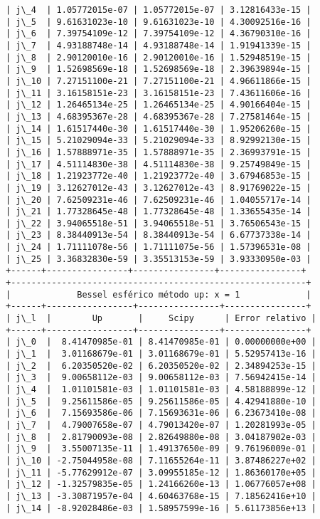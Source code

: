 \documentclass[9pt]{article}
\begin{document}
\begin{Verbatim}[commandchars=\\\{\}]
| j\_4  | 1.05772015e-07 | 1.05772015e-07 | 3.12816433e-15 |
| j\_5  | 9.61631023e-10 | 9.61631023e-10 | 4.30092516e-16 |
| j\_6  | 7.39754109e-12 | 7.39754109e-12 | 4.36790310e-16 |
| j\_7  | 4.93188748e-14 | 4.93188748e-14 | 1.91941339e-15 |
| j\_8  | 2.90120010e-16 | 2.90120010e-16 | 1.52948519e-15 |
| j\_9  | 1.52698569e-18 | 1.52698569e-18 | 2.39639894e-15 |
| j\_10 | 7.27151100e-21 | 7.27151100e-21 | 4.96611866e-15 |
| j\_11 | 3.16158151e-23 | 3.16158151e-23 | 7.43611606e-16 |
| j\_12 | 1.26465134e-25 | 1.26465134e-25 | 4.90166404e-15 |
| j\_13 | 4.68395367e-28 | 4.68395367e-28 | 7.27581464e-15 |
| j\_14 | 1.61517440e-30 | 1.61517440e-30 | 1.95206260e-15 |
| j\_15 | 5.21029094e-33 | 5.21029094e-33 | 8.92992130e-15 |
| j\_16 | 1.57888971e-35 | 1.57888971e-35 | 2.36993791e-15 |
| j\_17 | 4.51114830e-38 | 4.51114830e-38 | 9.25749849e-15 |
| j\_18 | 1.21923772e-40 | 1.21923772e-40 | 3.67946853e-15 |
| j\_19 | 3.12627012e-43 | 3.12627012e-43 | 8.91769022e-15 |
| j\_20 | 7.62509231e-46 | 7.62509231e-46 | 1.04055717e-14 |
| j\_21 | 1.77328645e-48 | 1.77328645e-48 | 1.33655435e-14 |
| j\_22 | 3.94065518e-51 | 3.94065518e-51 | 3.76506543e-15 |
| j\_23 | 8.38440913e-54 | 8.38440913e-54 | 6.67737338e-14 |
| j\_24 | 1.71111078e-56 | 1.71111075e-56 | 1.57396531e-08 |
| j\_25 | 3.36832830e-59 | 3.35513153e-59 | 3.93330950e-03 |
+------+----------------+----------------+----------------+
+----------------------------------------------------------+
|             Bessel esférico método up: x = 1             |
+------+-----------------+----------------+----------------+
| j\_l  |        Up       |     Scipy      | Error relativo |
+------+-----------------+----------------+----------------+
| j\_0  |  8.41470985e-01 | 8.41470985e-01 | 0.00000000e+00 |
| j\_1  |  3.01168679e-01 | 3.01168679e-01 | 5.52957413e-16 |
| j\_2  |  6.20350520e-02 | 6.20350520e-02 | 2.34894253e-15 |
| j\_3  |  9.00658112e-03 | 9.00658112e-03 | 7.56942415e-14 |
| j\_4  |  1.01101581e-03 | 1.01101581e-03 | 4.58188899e-12 |
| j\_5  |  9.25611586e-05 | 9.25611586e-05 | 4.42941880e-10 |
| j\_6  |  7.15693586e-06 | 7.15693631e-06 | 6.23673410e-08 |
| j\_7  |  4.79007658e-07 | 4.79013420e-07 | 1.20281993e-05 |
| j\_8  |  2.81790093e-08 | 2.82649880e-08 | 3.04187902e-03 |
| j\_9  |  3.55007135e-11 | 1.49137650e-09 | 9.76196009e-01 |
| j\_10 | -2.75044958e-08 | 7.11655264e-11 | 3.87486227e+02 |
| j\_11 | -5.77629912e-07 | 3.09955185e-12 | 1.86360170e+05 |
| j\_12 | -1.32579835e-05 | 1.24166260e-13 | 1.06776057e+08 |
| j\_13 | -3.30871957e-04 | 4.60463768e-15 | 7.18562416e+10 |
| j\_14 | -8.92028486e-03 | 1.58957599e-16 | 5.61173856e+13 |

\end{Verbatim}
\end{document}
